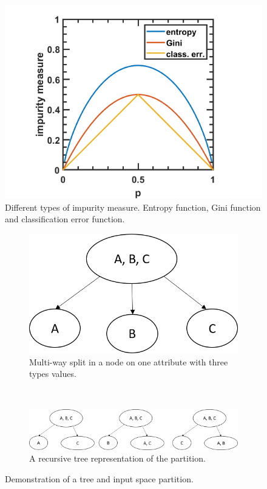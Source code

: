 \begin{refsection}
\begin{figure}[H]
	\centering
	\includegraphics[width=0.5\linewidth]{../figures/statisticalLearning/treeMethods/impurityMeasure}
	\caption{Different types of impurity measure. Entropy function, Gini function and classification error function.}
	\label{ch:statistical-learning:fig:impuritymeasure}
\end{figure}



\begin{figure}[H]
	\centering	
	\begin{subfigure}[b]{0.42\textwidth}
		\centering
		\includegraphics[width=0.7\linewidth]{../figures/statisticalLearning/treeMethods/decisionTreeMultiwaySplit}
		\caption{Multi-way split in a node on one attribute with three types values.}
	\end{subfigure}\\
	\begin{subfigure}[b]{1.0\textwidth}
		\centering
		\includegraphics[width=0.7\linewidth]{../figures/statisticalLearning/treeMethods/decisionTreeBinarySplit}
		\caption{A recursive tree representation of the partition.}
	\end{subfigure}
	\caption{Demonstration of a tree and input space partition.}
\end{figure}



\end{refsection}
